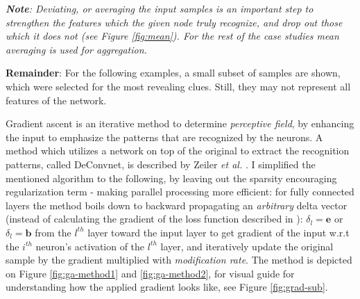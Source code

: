 \emph{\textbf{Note}: Deviating, or averaging the input samples is an important step to strengthen the features which the given node truly recognize, and drop out those which it does not (see Figure \ref{fig:mean}). For the rest of the case studies mean averaging is used for aggregation.}

\textbf{Remainder}: For the following examples, a small subset of samples are shown, which were selected for the most revealing clues. 
Still, they may not represent all features of the network.

Gradient ascent is an iterative method to determine \emph{perceptive field}, by enhancing the input to emphasize the patterns that are recognized by the neurons. 
A method which utilizes a network on top of the original to extract the recognition patterns, called DeConvnet, is described by Zeiler \emph{et al.} \cite{zeiler2014visualizing}. 
I simplified the mentioned algorithm to the following, by leaving out the sparsity encouraging regularization term - making parallel processing more efficient:
for fully connected layers the method boils down to backward propagating an \emph{arbitrary} delta vector (instead of calculating the gradient of the loss function described in \cite{zeiler2014visualizing}): 
$\delta_l = \mathbf{e}$ or $\delta_l =\mathbf{b}$
from the $l^{th}$ layer toward the input layer to get gradient of the input w.r.t the $i^{th}$ neuron's activation of the $l^{th}$ layer, and iteratively update the original sample by the gradient multiplied with \emph{modification rate}. The method is depicted on Figure \ref{fig:ga-method1} and \ref{fig:ga-method2}, 
for visual guide for understanding how the applied gradient looks like, see Figure \ref{fig:grad-sub}.



